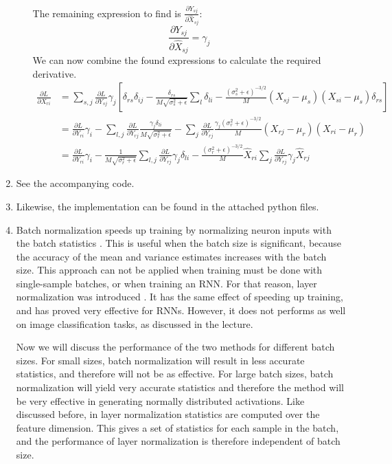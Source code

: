 \documentclass{article}
\newcommand{\pfrac}[2]{\frac{\partial #1}{\partial #2}}
\begin{document}
\begin{enumerate}[label=(\alph*)]
\begin{enumerate}[label=(\roman*)]
$$\begin{aligned}
		\end{aligned}
		$$ The remaining expression to find is $\pfrac{Y_{sj}}{\hat{X}_{sj}}$:
		$$
		\pfrac{Y_{sj}}{\hat{X}_{sj}} = \gamma_j
		$$ We can now combine the found expressions to calculate the required derivative.
		$$
		\begin{aligned}
		\pfrac{L}{X_{ri}} &= \sum_{s,j}\pfrac{L}{Y_{sj}}\gamma_j\left[\delta_{rs}\delta_{ij} -\frac{\delta_{rs}}{M\sqrt{\sigma_s^2 + \epsilon}}\sum_l\delta_{li} - \frac{\left(\sigma_s^2 + \epsilon\right)^{-3 / 2}}{M}\left(X_{sj} - \mu_s\right)\left(X_{si} - \mu_s\right)\delta_{rs}\right] \\ &= \pfrac{L}{Y_{ri}}\gamma_i - \sum_{l,j}\pfrac{L}{Y_{rj}}\frac{\gamma_j\delta_{li}}{M\sqrt{\sigma_r^2 + \epsilon}} - \sum_j\pfrac{L}{Y_{rj}}\frac{\gamma_j\left(\sigma_r^2 + \epsilon\right)^{-3 / 2}}{M}\left(X_{rj} - \mu_r\right)\left(X_{ri} - \mu_r\right) \\ &= \pfrac{L}{Y_{ri}}\gamma_i - \frac{1}{M\sqrt{\sigma_r^2 + \epsilon}}\sum_{l,j}\pfrac{L}{Y_{rj}}\gamma_j\delta_{li} - \frac{\left(\sigma_r^2 + \epsilon\right)^{-3 / 2}}{M}\hat{X}_{ri}\sum_j\pfrac{L}{Y_{rj}}\gamma_j\hat{X}_{rj}
		\end{aligned}
		$$
	\end{enumerate}
	\item
	See the accompanying code.
	\item
	Likewise, the implementation can be found in the attached python files.
	\item
	Batch normalization speeds up training by normalizing neuron inputs with the batch statistics \cite{ioffe2015batch}. This is useful when the batch size is significant, because the accuracy of the mean and variance estimates increases with the batch size. This approach can not be applied when training must be done with single-sample batches, or when training an RNN. For that reason, layer normalization was introduced \cite{ba2016layer}. It has the same effect of speeding up training, and has proved very effective for RNNs. However, it does not performs as well on image classification tasks, as discussed in the lecture.
	
	Now we will discuss the performance of the two methods for different batch sizes. For small sizes, batch normalization will result in less accurate statistics, and therefore will not be as effective. For large batch sizes, batch normalization will yield very accurate statistics and therefore the method will be very effective in generating normally distributed activations. Like discussed before, in layer normalization statistics are computed over the feature dimension. This gives a set of statistics for each sample in the batch, and the performance of layer normalization is therefore independent of batch size. 
\end{enumerate}


\end{document}
